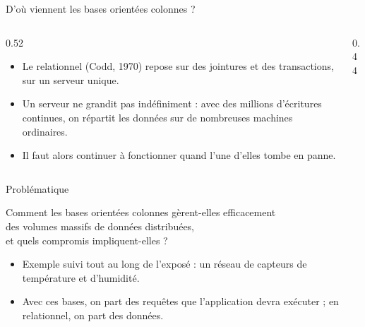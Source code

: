 \documentclass[aspectratio=169,10pt]{beamer}
\begin{document}
\begin{frame}{D'où viennent les bases orientées colonnes ?}
  \begin{columns}[T]
    \begin{column}{0.52\textwidth}
      \begin{itemize}
        \item Le relationnel (Codd, 1970) repose sur des jointures et des transactions, sur un serveur unique.
        \item Un serveur ne grandit pas indéfiniment : avec des millions d'écritures continues, on répartit les données sur de nombreuses machines ordinaires.
        \item Il faut alors continuer à fonctionner quand l'une d'elles tombe en panne.
      \end{itemize}
    \end{column}
    \begin{column}{0.44\textwidth}
      \centering
    \end{column}
  \end{columns}
\end{frame}

\begin{frame}{Problématique}
  \vfill
  \begin{block}{}
    \centering\large
    Comment les bases orientées colonnes gèrent-elles efficacement\\des volumes massifs de données distribuées,\\et quels compromis impliquent-elles ?
  \end{block}
  \vspace{0.6cm}
  \begin{itemize}
    \item Exemple suivi tout au long de l'exposé : un réseau de capteurs de température et d'humidité.
    \item Avec ces bases, on part des requêtes que l'application devra exécuter ; en relationnel, on part des données.
  \end{itemize}
  \vfill
\end{frame}
\end{document}
